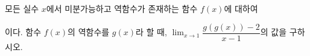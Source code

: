 모든 실수 $x$에서 미분가능하고 역함수가 존재하는 함수 $f(x)$에 대하여 \par\smallskip{}\par\smallskip\noindent 이다. 함수 $f(x)$의 역함수를 $g(x)$라 할 때, $\displaystyle\lim_{x\to 1}\dfrac{g(g(x))-2}{x-1}$의 값을 구하시오.
